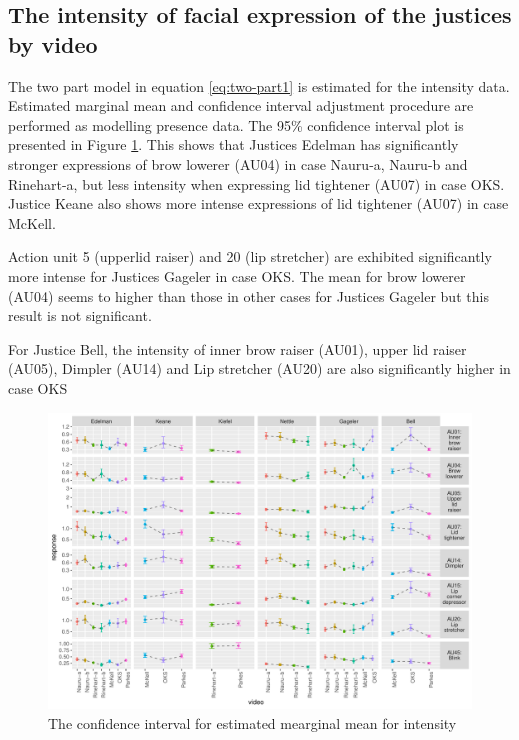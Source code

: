 \documentclass{monashthesis}
\begin{document}
\hypertarget{the-intensity-of-facial-expression-of-the-justices-by-video}{%
\subsection{The intensity of facial expression of the justices by video}\label{the-intensity-of-facial-expression-of-the-justices-by-video}}

The two part model in equation \ref{eq:two-part1} is estimated for the intensity data. Estimated marginal mean and confidence interval adjustment procedure are performed as modelling presence data. The 95\% confidence interval plot is presented in Figure \ref{fig:intensity-video}. This shows that Justices Edelman has significantly stronger expressions of brow lowerer (AU04) in case Nauru-a, Nauru-b and Rinehart-a, but less intensity when expressing lid tightener (AU07) in case OKS. Justice Keane also shows more intense expressions of lid tightener (AU07) in case McKell.

Action unit 5 (upperlid raiser) and 20 (lip stretcher) are exhibited significantly more intense for Justices Gageler in case OKS. The mean for brow lowerer (AU04) seems to higher than those in other cases for Justices Gageler but this result is not significant.

For Justice Bell, the intensity of inner brow raiser (AU01), upper lid raiser (AU05), Dimpler (AU14) and Lip stretcher (AU20) are also significantly higher in case OKS

\begin{figure}

{\centering \includegraphics[width=1\linewidth]{figures/intensity-video-1} 

}

\caption{The confidence interval for estimated mearginal mean for intensity}\label{fig:intensity-video}
\end{figure}
\end{document}

